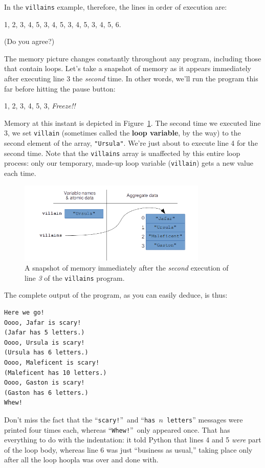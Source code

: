 In the \texttt{villains} example, therefore, the lines in order of execution
are:

\begin{center}
1, 2, 3, 4, 5, 3, 4, 5, 3, 4, 5, 3, 4, 5, 6.
\end{center}

(Do you agree?)

The memory picture changes constantly throughout any program, including those
that contain loops. Let's take a snapshot of memory as it appears immediately
after executing line 3 the \textit{second} time. In other words, we'll run the
program this far before hitting the pause button:

\begin{center}
1, 2, 3, 4, 5, 3, \textit{Freeze!!}
\end{center}


Memory at this instant is depicted in Figure~\ref{fig:loopsMemory}. The second
time we executed line 3, we set \texttt{villain} (sometimes called the
\textbf{loop variable}, by the way) to the second element of the array,
\texttt{"Ursula"}. We're just about to execute line 4 for the second time. Note
that the \texttt{villains} array is unaffected by this entire loop process:
only our temporary, made-up loop variable (\texttt{villain}) gets a new value
each time.

\begin{figure}[ht]
\centering
\includegraphics[width=0.8\textwidth]{loopsMemory.png}
\caption{A snapshot of memory immediately after the \textit{second} execution
of line \textit{3} of the \texttt{villains} program.}
\label{fig:loopsMemory}
\end{figure}

The complete output of the program, as you can easily deduce, is thus:

\begin{Verbatim}[fontsize=\small,samepage=true,frame=leftline,framesep=5mm,framerule=1mm]
Here we go!
Oooo, Jafar is scary!
(Jafar has 5 letters.)
Oooo, Ursula is scary!
(Ursula has 6 letters.)
Oooo, Maleficent is scary!
(Maleficent has 10 letters.)
Oooo, Gaston is scary!
(Gaston has 6 letters.)
Whew!
\end{Verbatim}

Don't miss the fact that the ``\texttt{scary!}''~and ``\texttt{has $n$
letters}'' messages were printed four times each, whereas
``\texttt{Whew!}''~only appeared once. That has everything to do with the
indentation: it told Python that lines 4 and 5 \textit{were} part of the loop
body, whereas line 6 was just ``business as usual,'' taking place only after
all the loop hoopla was over and done with.

